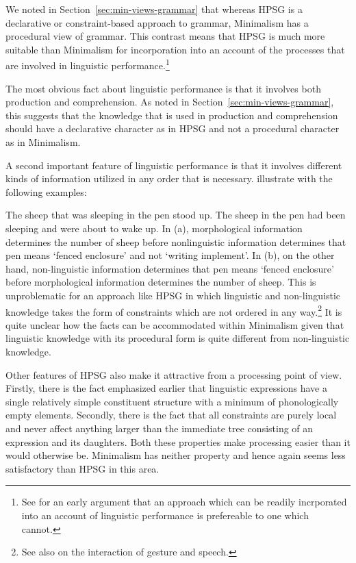 \documentclass[output=paper
	        ,collection
	        ,collectionchapter
 	        ,biblatex
                ,babelshorthands
                ,newtxmath
                ,draftmode
                ,colorlinks, citecolor=brown
]{langscibook}
\begin{document}
We noted in Section~\ref{sec:min-views-grammar} that whereas HPSG is a declarative or
constraint-based approach to grammar, Minimalism has a procedural view of grammar. This contrast
means that HPSG is much more suitable than Minimalism for incorporation into an account of the
processes that are involved in linguistic performance.\footnote{
  See \citet{BK82a} for an early argument that an approach which can be readily incrporated into an account of linguistic performance is prefereable to one which cannot.
}

The most obvious fact about linguistic performance is that it involves both production and
comprehension. As noted in Section~\ref{sec:min-views-grammar}, this suggests that the knowledge
that is used in production and comprehension should have a declarative character as in HPSG and not
a procedural character as in Minimalism.

A second important feature of linguistic performance is
that it involves different kinds of information utilized in any order that is
necessary. \citet[--368]{SW2011a} illustrate with the following examples:

\eal
\label{ex-sheep-pen-processing}
\ex 	The sheep that was sleeping in the pen stood up.
\ex	The sheep in the pen had been sleeping and were about to wake up.
\zl
%
In (a), morphological information determines the number of sheep before nonlinguistic
information determines that pen means ‘fenced enclosure’ and not ‘writing implement’. In (b), on
the other hand, non-linguistic information determines that pen means ‘fenced enclosure’ before
morphological information determines the number of sheep. This is unproblematic for an approach like
HPSG in which linguistic and non-linguistic knowledge takes the form of constraints which are not
ordered in any way.\footnote{%
  See also  on the interaction of gesture and speech.
}
It is quite unclear how the facts can be accommodated within Minimalism given
that linguistic knowledge with its procedural form is quite different from non-linguistic knowledge.

Other features of HPSG also make it attractive from a processing point of view. Firstly, there is
the fact emphasized earlier that linguistic expressions have a single relatively simple constituent
structure with a minimum of phonologically empty elements. Secondly, there is the fact that all
constraints are purely local and never affect anything larger than the immediate tree consisting of an
expression and its daughters. Both these properties make processing easier than it would otherwise
be. Minimalism has neither property and hence again seems less satisfactory than HPSG in this area.
\end{document}
